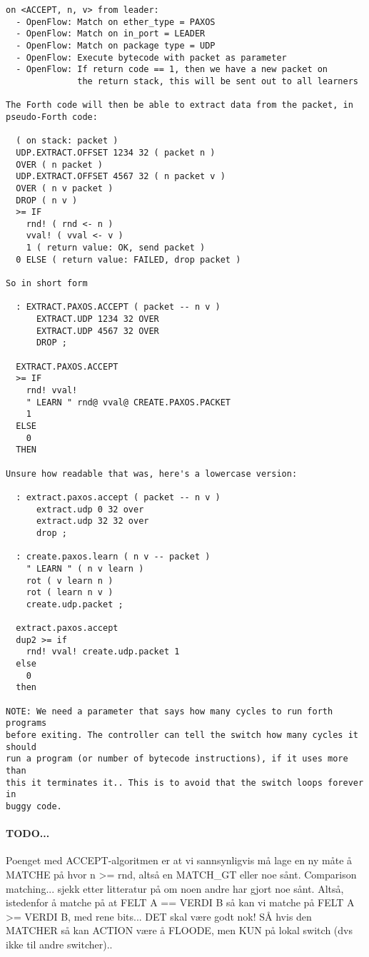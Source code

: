 \begin{verbatim}
on <ACCEPT, n, v> from leader:
  - OpenFlow: Match on ether_type = PAXOS
  - OpenFlow: Match on in_port = LEADER
  - OpenFlow: Match on package type = UDP
  - OpenFlow: Execute bytecode with packet as parameter
  - OpenFlow: If return code == 1, then we have a new packet on
              the return stack, this will be sent out to all learners

The Forth code will then be able to extract data from the packet, in
pseudo-Forth code:

  ( on stack: packet )
  UDP.EXTRACT.OFFSET 1234 32 ( packet n )
  OVER ( n packet )
  UDP.EXTRACT.OFFSET 4567 32 ( n packet v )
  OVER ( n v packet )
  DROP ( n v )
  >= IF
    rnd! ( rnd <- n )
    vval! ( vval <- v )
    1 ( return value: OK, send packet )
  0 ELSE ( return value: FAILED, drop packet )

So in short form

  : EXTRACT.PAXOS.ACCEPT ( packet -- n v )
      EXTRACT.UDP 1234 32 OVER
      EXTRACT.UDP 4567 32 OVER
      DROP ;

  EXTRACT.PAXOS.ACCEPT
  >= IF
    rnd! vval!
    " LEARN " rnd@ vval@ CREATE.PAXOS.PACKET
    1
  ELSE
    0
  THEN

Unsure how readable that was, here's a lowercase version:

  : extract.paxos.accept ( packet -- n v )
      extract.udp 0 32 over
      extract.udp 32 32 over
      drop ;

  : create.paxos.learn ( n v -- packet )
    " LEARN " ( n v learn )
    rot ( v learn n )
    rot ( learn n v )
    create.udp.packet ;

  extract.paxos.accept
  dup2 >= if
    rnd! vval! create.udp.packet 1
  else
    0
  then

NOTE: We need a parameter that says how many cycles to run forth programs
before exiting. The controller can tell the switch how many cycles it should
run a program (or number of bytecode instructions), if it uses more than
this it terminates it.. This is to avoid that the switch loops forever in
buggy code.
\end{verbatim}

\paragraph{TODO...}

Poenget med ACCEPT-algoritmen er at vi sannsynligvis må lage en ny måte å
MATCHE på hvor n >= rnd, altså en MATCH\_{}GT eller noe sånt.  Comparison
matching... sjekk etter litteratur på om noen andre har gjort noe sånt.
Altså, istedenfor å matche på at FELT A == VERDI B så kan vi matche på FELT
A >= VERDI B, med rene bits... DET skal være godt nok!  SÅ hvis den MATCHER
så kan ACTION være å FLOODE, men KUN på lokal switch (dvs ikke til andre
switcher)..

